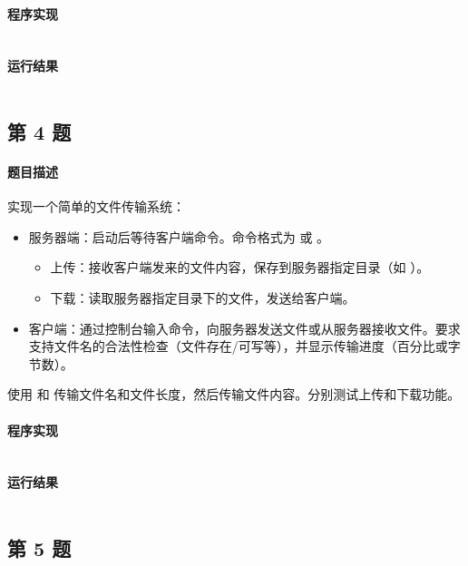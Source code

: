 \documentclass{academics}
\begin{document}
\paragraph{程序实现} {
    \inputminted[label=MultiTcpServer.java]{java}{../src/P03/MultiTcpServer.java}
}

\paragraph{运行结果} {
    \inputminted{text}{../res/P03.out}
}

\subsection{第 4 题}

\paragraph{题目描述} {
    实现一个简单的文件传输系统：
    \begin{itemize}
        \item 服务器端：启动后等待客户端命令。命令格式为  或 。
        \begin{itemize}
            \item 上传：接收客户端发来的文件内容，保存到服务器指定目录（如 ）。
            \item 下载：读取服务器指定目录下的文件，发送给客户端。
        \end{itemize}
        \item 客户端：通过控制台输入命令，向服务器发送文件或从服务器接收文件。要求支持文件名的合法性检查（文件存在/可写等），并显示传输进度（百分比或字节数）。
    \end{itemize}
    使用  和  传输文件名和文件长度，然后传输文件内容。分别测试上传和下载功能。
}

\paragraph{程序实现} {
    \inputminted[label=FileTransfer.java]{java}{../src/P04/FileTransfer.java}
}

\paragraph{运行结果} {
    \inputminted{text}{../res/P04.out}
}

\subsection{第 5 题}
\end{document}

